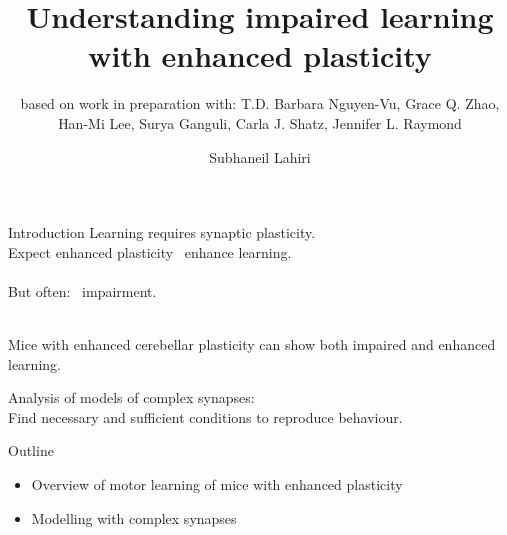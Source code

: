 \documentclass{beamer}%
\title[Impaired learning with enhanced plasticity]{Understanding impaired learning with enhanced plasticity}
\subtitle{\small{based on work in preparation with: T.D. Barbara Nguyen-Vu, Grace Q. Zhao, Han-Mi Lee, Surya Ganguli, Carla J. Shatz, Jennifer L. Raymond
}}
\author{Subhaneil Lahiri%
}
\institute[Stanford]{%
Stanford University, Applied Physics
}
\begin{document}

\begin{frame}
%
 \titlepage
%
\end{frame}


\begin{frame}{Introduction}
%
 Learning requires synaptic plasticity.\\
 Expect enhanced plasticity \lto\ enhance learning.\\
 \\
 But often: \lto\ impairment.\\
 \\

 \vp Mice with enhanced cerebellar plasticity can show both impaired and enhanced learning.

 \vp Analysis of models of complex synapses:\\ 
Find necessary and sufficient conditions to reproduce behaviour.
%
\end{frame}


\begin{frame}{Outline}
%
 \begin{itemize}
   \item Overview of motor learning of mice with enhanced plasticity
   
   \vp\item Modelling with complex synapses
 \end{itemize}
%
\end{frame}

%
%
\end{document}
